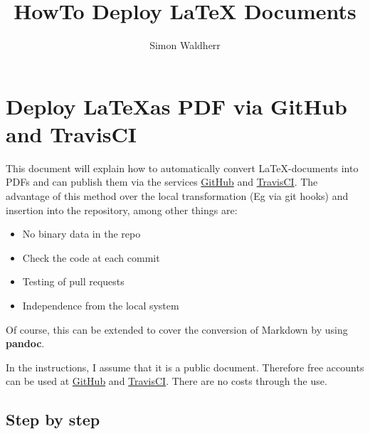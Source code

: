 \documentclass[10pt,letterpaper]{article}
\date{}
\title{HowTo Deploy LaTeX Documents}
\author{Simon Waldherr}
\providecommand{\tightlist}{
  \setlength{\itemsep}{0pt}\setlength{\parskip}{0pt}}
\begin{document}
\section{Deploy \LaTeX as PDF via GitHub and TravisCI}\label{deploy-latex-as-pdf-via-github-and-travisci}

This document will explain how to automatically convert \LaTeX -documents
into PDFs and can publish them via the services
\href{https://github.com/}{GitHub} and
\href{https://travis-ci.org/}{TravisCI}. The advantage of this method
over the local transformation (Eg via git hooks) and insertion into the
repository, among other things are:

\begin{itemize}
\tightlist
\item
  No binary data in the repo
\item
  Check the code at each commit
\item
  Testing of pull requests
\item
  Independence from the local system
\end{itemize}

Of course, this can be extended to cover the conversion of Markdown by
using \textbf{pandoc}.

In the instructions, I assume that it is a public document. Therefore
free accounts can be used at \href{https://github.com/}{GitHub} and
\href{https://travis-ci.org/}{TravisCI}. There are no costs through the
use.

\subsection{Step by step}\label{step-by-step}
\end{document}
